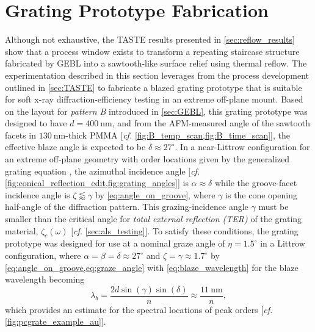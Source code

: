 \section[Grating Prototype Fabrication]{Grating Prototype Fabrication}\label{sec:TASTE_prototype} 
Although not exhaustive, the TASTE results presented in \cref{sec:reflow_results} show that a process window exists to transform a repeating staircase structure fabricated by GEBL into a sawtooth-like surface relief using thermal reflow. 
The experimentation described in this section leverages from the process development outlined in \cref{sec:TASTE} to fabricate a blazed grating prototype that is suitable for soft x-ray diffraction-efficiency testing in an extreme off-plane mount. 
Based on the layout for \emph{pattern B} introduced in \cref{sec:GEBL}, this grating prototype was designed to have $d = \SI{400}{\nm}$, and from the AFM-measured angle of the sawtooth facets in $\SI{130}{\nm}$-thick PMMA [\emph{cf.\@} \cref{fig:B_temp_scan,fig:B_time_scan}], the effective blaze angle is expected to be $\delta \approx 27^{\circ}$. %
In a near-Littrow configuration for an extreme off-plane geometry with order locations given by the generalized grating equation \cite[\emph{cf.\@} \cref{eq:off-plane_orders,eq:off-plane_orders_ch2,eq:off-plane_incidence_orders}]{Loewen97}, the azimuthal incidence angle [\emph{cf.\@} \cref{fig:conical_reflection_edit,fig:grating_angles}] is $\alpha \approx \delta$ while the groove-facet incidence angle is $\zeta \lessapprox \gamma$ by \cref{eq:angle_on_groove}, where $\gamma$ is the cone opening half-angle of the diffraction pattern. 
This grazing-incidence angle $\gamma$ must be smaller than the critical angle for \emph{total external reflection (TER)} of the grating material, $\zeta_c (\omega)$ [\emph{cf.\@} \cref{sec:als_testing}]. 
To satisfy these conditions, the grating prototype was designed for use at a nominal graze angle of $\eta = 1.5^{\circ}$ in a Littrow configuration, where $\alpha = \beta = \delta \approx 27^{\circ}$ and $\zeta = \gamma \approx 1.7^{\circ}$ by \cref{eq:angle_on_groove,eq:graze_angle} with \cref{eq:blaze_wavelength} for the blaze wavelength becoming  
\begin{equation}\label{eq:blaze_wavelength_TASTE}
 \lambda_b = \frac{2 d \sin \left( \gamma \right) \sin \left( \delta \right) }{n} \approx \frac{\SI{11}{\nm}}{n} ,
 \end{equation}
which provides an estimate for the spectral locations of peak orders [\emph{cf.\@} \cref{fig:pcgrate_example_au}]. 

